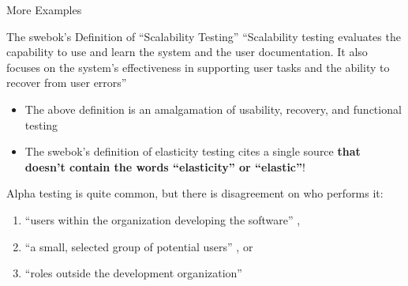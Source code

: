 \documentclass[22pt]{beamer}
\begin{document}
\begin{frame}[fragile]
\begin{textblock}{7.25}
\begin{block}{\fontsize{37}{20}\selectfont More Examples}
            \quad\\ %

            \begin{center}
                \begin{minipage}{.9\textwidth}
                    \begin{exampleblock}{The \acs{swebok}'s Definition of
                            ``Scalability Testing''}
                        {\fontsize{28}{13}\selectfont
                            ``Scalability testing evaluates the capability to
                            use and learn the system and the user documentation.
                            It also focuses on the system's effectiveness in
                            supporting user tasks and the ability to recover
                            from user errors'' \cite[p.~5-9]{SWEBOK2024}}
                    \end{exampleblock}
                \end{minipage}
            \end{center}

            \begin{itemize}
                \item The above definition is an amalgamation of usability,
                      recovery, and functional testing
                \item The \acs{swebok}'s definition of elasticity testing cites
                      a single source \cite[p.~5-9]{SWEBOK2024}
                      \textbf{that doesn't contain the words ``elasticity'' or ``elastic''}!
            \end{itemize}

            \vspace{5mm}

            Alpha testing is quite common, but there is disagreement on who
            performs it:
            \begin{enumerate}
                \item ``users within the organization developing the software''
                      \cite[p.~17]{IEEE2017},
                \item ``a small, selected group of potential users''
                      \cite[p.~5-8]{SWEBOK2024}, or
                \item ``roles outside the development organization''
                      \cite{ISTQB}
            \end{enumerate}
            \vspace{5mm}
        \end{block}


\end{textblock}
\end{frame}
\end{document}
